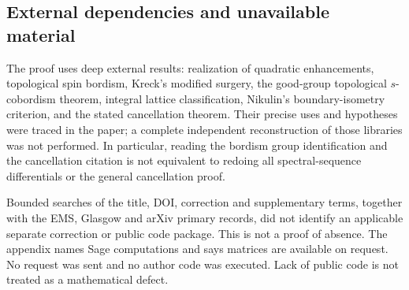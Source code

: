\documentclass[10pt]{article}
\begin{document}
\subsection*{External dependencies and unavailable material}
The proof uses deep external results: realization of quadratic enhancements, topological spin bordism, Kreck’s modified surgery, the good-group topological \(s\)-cobordism theorem, integral lattice classification, Nikulin’s boundary-isometry criterion, and the stated cancellation theorem. Their precise uses and hypotheses were traced in the paper; a complete independent reconstruction of those libraries was not performed. In particular, reading the bordism group identification and the cancellation citation is not equivalent to redoing all spectral-sequence differentials or the general cancellation proof.\par
Bounded searches of the title, DOI, correction and supplementary terms, together with the EMS, Glasgow and arXiv primary records, did not identify an applicable separate correction or public code package. This is not a proof of absence. The appendix names Sage computations and says matrices are available on request. No request was sent and no author code was executed. Lack of public code is not treated as a mathematical defect.\par
\end{document}

